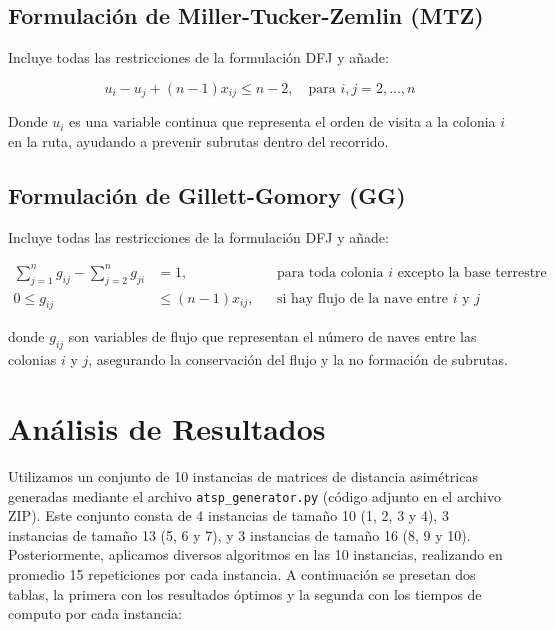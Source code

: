 \documentclass[
	spanish, %
	oneside
]{article}
\begin{document}
\subsection*{Formulación de Miller-Tucker-Zemlin (MTZ)}

Incluye todas las restricciones de la formulación DFJ y añade:

\begin{equation}
    u_i - u_j + (n - 1)x_{ij} \leq n - 2, \quad \text{para } i, j = 2, \ldots, n
\end{equation}

\noindent Donde \( u_i \) es una variable continua que representa el orden de visita a la colonia \( i \) en la ruta, ayudando a prevenir subrutas dentro del recorrido.

\subsection*{Formulación de Gillett-Gomory (GG)}

Incluye todas las restricciones de la formulación DFJ y añade:

\begin{align}
    \sum_{j=1}^{n} g_{ij} - \sum_{j=2}^{n} g_{ji} &= 1, && \text{para toda colonia } i \text{ excepto la base terrestre} \\
    0 \leq g_{ij} &\leq (n - 1)x_{ij}, && \text{si hay flujo de la nave entre } i \text{ y } j
\end{align}
	


donde \( g_{ij} \) son variables de flujo que representan el número de naves entre las colonias \( i \) y \( j \), asegurando la conservación del flujo y la no formación de subrutas.



\newpage
\section{Análisis de Resultados}

Utilizamos un conjunto de 10 instancias de matrices de distancia asimétricas generadas mediante el archivo \texttt{atsp\_generator.py} (código adjunto en el archivo ZIP). Este conjunto consta de 4 instancias de tamaño 10 (1, 2, 3 y 4), 3 instancias de tamaño 13 (5, 6 y 7), y 3 instancias de tamaño 16 (8, 9 y 10). Posteriormente, aplicamos diversos algoritmos en las 10 instancias, realizando en promedio 15 repeticiones por cada instancia.
A continuación se presetan dos tablas, la primera con los resultados óptimos y la segunda con los tiempos de computo por cada instancia:
\end{document}
